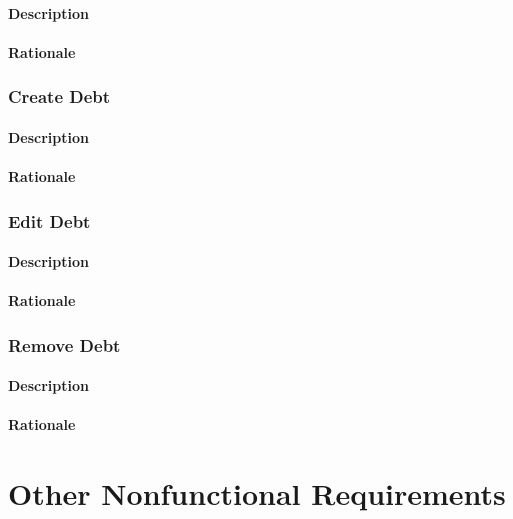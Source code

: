 \documentclass{scrreprt}
\begin{document}
\subsubsection{Description}

\subsubsection{Rationale}

\subsection{Create Debt}
\subsubsection{Description}

\subsubsection{Rationale}

\subsection{Edit Debt}
\subsubsection{Description}

\subsubsection{Rationale}

\subsection{Remove Debt}
\subsubsection{Description}

\subsubsection{Rationale}

\chapter{Other Nonfunctional Requirements}
\end{document}

